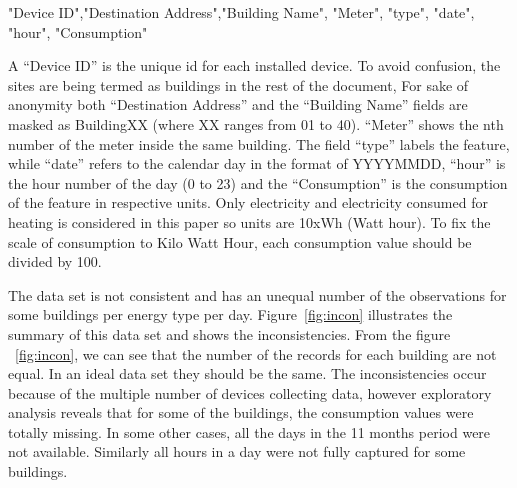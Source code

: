 "Device ID","Destination Address","Building Name", "Meter", "type", "date", "hour", "Consumption"

A ``Device ID'' is the unique id for each installed device. To avoid confusion, the sites are being termed as buildings in the rest of the document, For sake of anonymity both ``Destination Address'' and the ``Building Name'' fields are masked as BuildingXX (where XX ranges from  01 to 40). ``Meter'' shows the nth number of the meter inside the same building. The field ``type'' labels the feature, while ``date'' refers to the calendar day in the format of YYYYMMDD, ``hour'' is the hour number of the day (0 to 23) and the ``Consumption'' is the consumption of the feature in respective units. Only electricity and electricity consumed for heating is considered in this paper so units are 10xWh (Watt hour).
To fix the scale of consumption to Kilo Watt Hour, each consumption value should be divided by 100. 

The data set is not consistent and has an unequal number of the observations for some buildings per energy type per day. Figure~\ref{fig:incon} illustrates the summary of this data set and shows the inconsistencies. From the figure ~\ref{fig:incon}, we can see that the number of the records for each building are not equal. In an ideal data set they should be the same. The inconsistencies occur because of the multiple number of devices collecting data, however exploratory analysis reveals that for some of the buildings, the consumption values were totally missing. In some other cases, all the days in the 11 months period were not available. Similarly all hours in a day were not fully captured for some buildings.

